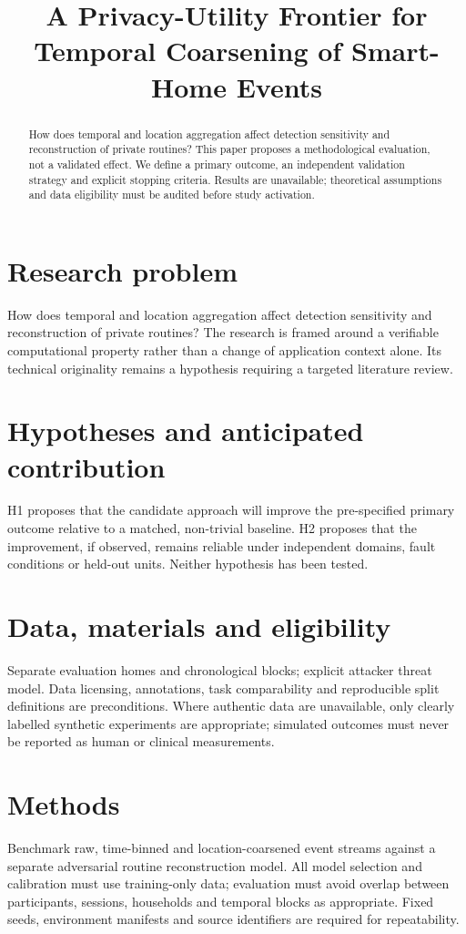 \documentclass[11pt,a4paper]{article}
\title{A Privacy-Utility Frontier for Temporal Coarsening of Smart-Home Events}
\author{}
\date{}
\begin{document}
\maketitle
\begin{abstract}
How does temporal and location aggregation affect detection sensitivity and reconstruction of private routines? This paper proposes a methodological evaluation, not a validated effect. We define a primary outcome, an independent validation strategy and explicit stopping criteria. Results are unavailable; theoretical assumptions and data eligibility must be audited before study activation.
\end{abstract}
\section{Research problem}
How does temporal and location aggregation affect detection sensitivity and reconstruction of private routines? The research is framed around a verifiable computational property rather than a change of application context alone. Its technical originality remains a hypothesis requiring a targeted literature review.
\section{Hypotheses and anticipated contribution}
H1 proposes that the candidate approach will improve the pre-specified primary outcome relative to a matched, non-trivial baseline. H2 proposes that the improvement, if observed, remains reliable under independent domains, fault conditions or held-out units. Neither hypothesis has been tested.
\section{Data, materials and eligibility}
Separate evaluation homes and chronological blocks; explicit attacker threat model. Data licensing, annotations, task comparability and reproducible split definitions are preconditions. Where authentic data are unavailable, only clearly labelled synthetic experiments are appropriate; simulated outcomes must never be reported as human or clinical measurements.
\section{Methods}
Benchmark raw, time-binned and location-coarsened event streams against a separate adversarial routine reconstruction model. All model selection and calibration must use training-only data; evaluation must avoid overlap between participants, sessions, households and temporal blocks as appropriate. Fixed seeds, environment manifests and source identifiers are required for repeatability.
\end{document}
